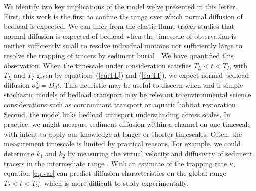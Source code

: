 \documentclass[]{agujournal2018}
\begin{document}
We identify two key implications of the model we've presented in this letter.
First, this work is the first to confine the range over which normal diffusion of bedload is expected. We can infer from the classic flume tracer studies that normal diffusion is expected of bedload when the timescale of observation is neither sufficiently small to resolve individual motions nor sufficiently large to resolve the trapping of tracers by sediment burial \citep{Einstein1937, Einstein1942, Yano1969, Yano1969a, Nakagawa1976}. 
We have quantified this observation. When the timescale under consideration satisfies $T_L<t<T_I$, with $T_L$ and $T_I$ given by equations (\ref{eq:TL}) and (\ref{eq:TI}), we expect normal bedload diffusion $\sigma_x^2 = D_dt$. This heuristic may be useful to discern when and if simple stochastic models of bedload transport may be relevant to environmental science considerations such as contaminant transport \citep[e.g][]{Malmon2005,Macklin2006} or aquatic habitat restoration \citep[e.g.][]{Gaeuman2017}.
Second, the model links bedload transport understanding across scales. In practice, we might measure sediment diffusion within a channel on one timescale with intent to apply our knowledge at longer or shorter timescales. Often, the measurement timescale is limited by practical reasons. For example, we could determine $k_1$ and $k_2$ by measuring the virtual velocity and diffusivity of sediment tracers in the intermediate range \citep[e.g.][]{Hassan2017}. With an estimate of the trapping rate $\kappa$, equation \ref{eq:var} can predict diffusion characteristics on the global range $T_I<t<T_G$, which is more difficult to study experimentally.
\end{document}
